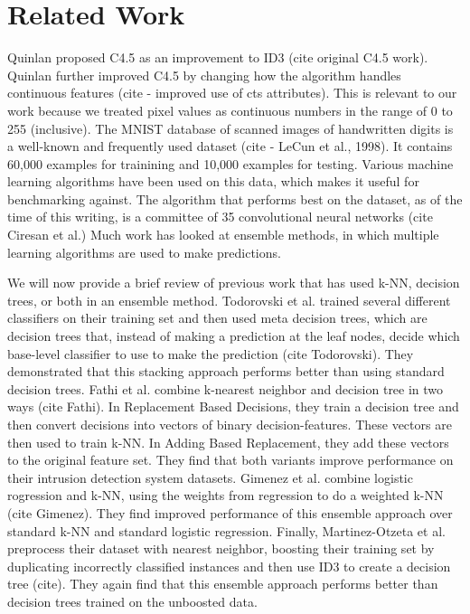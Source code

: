 \section{Related Work}
Quinlan proposed C4.5 as an improvement to ID3 (cite original C4.5 work). Quinlan further improved C4.5 by changing how the algorithm handles continuous features (cite - improved use of cts attributes). This is relevant to our work because we treated pixel values as continuous numbers in the range of 0 to 255 (inclusive). 
The MNIST database of scanned images of handwritten digits is a well-known and frequently used dataset (cite - LeCun et al., 1998). It contains 60,000 examples for trainining and 10,000 examples for testing. Various machine learning algorithms have been used on this data, which makes it useful for benchmarking against. The algorithm that performs best on the dataset, as of the time of this writing, is a committee of 35 convolutional neural networks (cite Ciresan et al.)
Much work has looked at ensemble methods, in which multiple learning algorithms are used to make predictions. 

We will now provide a brief review of previous work that has used k-NN, decision trees, or both in an ensemble method. Todorovski et al. trained several different classifiers on their training set and then used meta decision trees, which are decision trees that, instead of making a prediction at the leaf nodes, decide which base-level classifier to use to make the prediction (cite Todorovski). They demonstrated that this stacking approach performs better than using standard decision trees.
Fathi et al. combine k-nearest neighbor and decision tree in two ways (cite Fathi). In Replacement Based Decisions, they train a decision tree and then convert decisions into vectors of binary decision-features. These vectors are then used to train k-NN. In Adding Based Replacement, they add these vectors to the original feature set. They find that both variants improve performance on their intrusion detection system datasets.
Gimenez et al. combine logistic rogression and k-NN, using the weights from regression to do a weighted k-NN (cite Gimenez). They find improved performance of this ensemble approach over standard k-NN and standard logistic regression. Finally, Martinez-Otzeta et al. preprocess their dataset with nearest neighbor, boosting their training set by duplicating incorrectly classified instances and then use ID3 to create a decision tree (cite). They again find that this ensemble approach performs better than decision trees trained on the unboosted data. 

